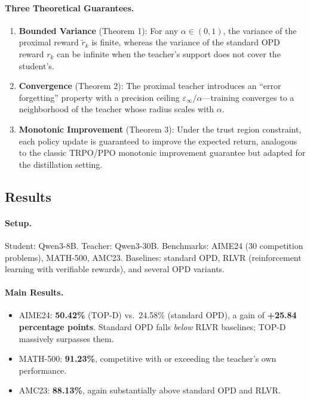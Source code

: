\documentclass[11pt,a4paper]{article}
\begin{document}
\paragraph{Three Theoretical Guarantees.}
\begin{enumerate}
\item \textbf{Bounded Variance} (Theorem 1): For any $\alpha \in (0, 1)$, the variance of the proximal reward $\tilde{r}_k$ is finite, whereas the variance of the standard OPD reward $r_k$ can be infinite when the teacher's support does not cover the student's.
\item \textbf{Convergence} (Theorem 2): The proximal teacher introduces an ``error forgetting'' property with a precision ceiling $\varepsilon_\infty / \alpha$---training converges to a neighborhood of the teacher whose radius scales with $\alpha$.
\item \textbf{Monotonic Improvement} (Theorem 3): Under the trust region constraint, each policy update is guaranteed to improve the expected return, analogous to the classic TRPO/PPO monotonic improvement guarantee but adapted for the distillation setting.
\end{enumerate}

\subsection{Results}

\paragraph{Setup.} Student: Qwen3-8B. Teacher: Qwen3-30B. Benchmarks: AIME24 (30 competition problems), MATH-500, AMC23. Baselines: standard OPD, RLVR (reinforcement learning with verifiable rewards), and several OPD variants.

\paragraph{Main Results.}
\begin{itemize}
\item AIME24: \textbf{50.42\%} (TOP-D) vs.\ 24.58\% (standard OPD), a gain of \textbf{+25.84 percentage points}. Standard OPD falls \emph{below} RLVR baselines; TOP-D massively surpasses them.
\item MATH-500: \textbf{91.23\%}, competitive with or exceeding the teacher's own performance.
\item AMC23: \textbf{88.13\%}, again substantially above standard OPD and RLVR.
\end{itemize}
\end{document}
